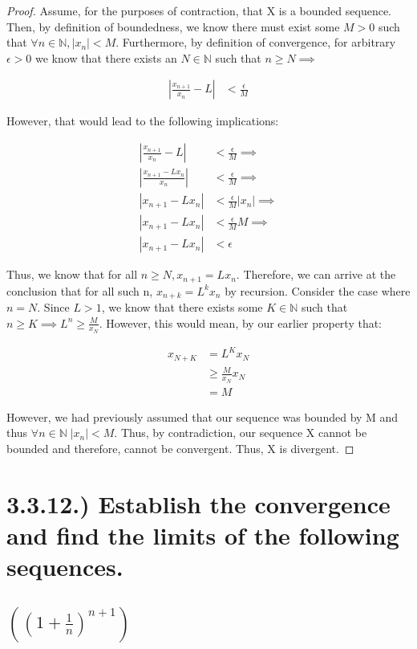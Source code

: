 \documentclass{article}
\newcommand{\mysection}[1]{
	\refstepcounter{section}
	\section*{#1}
}
\begin{document}
\begin{proof}
	Assume, for the purposes of contraction, that X is a bounded sequence. Then, by definition of boundedness, we know there must exist some $M > 0$ such that $\forall n \in \mathbb{N}, |x_n| < M$. Furthermore, by definition of convergence, for arbitrary $\epsilon > 0$ we know that there exists an $N \in \mathbb{N}$ such that $n \ge N \implies$

	\begin{align*}
		|\frac{x_{n+1}}{x_n} - L| &< \frac{\epsilon}{M}
	\end{align*}

	However, that would lead to the following implications:

	\begin{align*}
		|\frac{x_{n+1}}{x_n} - L| &< \frac{\epsilon}{M} \implies \\
		|\frac{x_{n+1} - Lx_n}{x_n}| &< \frac{\epsilon}{M} \implies \\
		|x_{n+1} - L{x_n}| &< \frac{\epsilon}{M}|x_n| \implies \\
		|x_{n+1} - L{x_n}| &< \frac{\epsilon}{M}{M} \implies \\
		|x_{n+1} - L{x_n}| &< \epsilon
	\end{align*}

	Thus, we know that for all $n \ge N, x_{n+1} = Lx_n$. Therefore, we can arrive at the conclusion that for all such n, $x_{n+k} = L^kx_n $ by recursion. Consider the case where $n = N$. Since $L > 1$, we know that there exists some $K \in \mathbb{N}$ such that $n \ge K \implies L^n \ge \frac{M}{x_{N}}$. However, this would mean, by our earlier property that:

	\begin{align*}
		x_{N+K} &= L^Kx_{N} \\
		&\ge \frac{M}{x_{N}}x_{N} \\
		&= M
	\end{align*}

	However, we had previously assumed that our sequence was bounded by M and thus $\forall n \in \mathbb{N} \; |x_n| < M $. Thus, by contradiction, our sequence X cannot be bounded and therefore, cannot be convergent. Thus, X is divergent.
\end{proof}

\newpage

\mysection{3.3.12.) Establish the convergence and find the limits of the following sequences.}

\subsection{$((1+\frac{1}{n})^{n+1})$}
\end{document}
